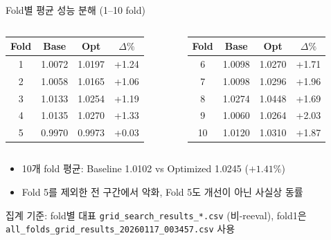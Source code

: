 \documentclass[aspectratio=169,10pt]{beamer}
\begin{document}
\begin{frame}[shrink=5]{Fold별 평균 성능 분해 (1--10 fold)}
	\begin{columns}[T]
		\renewcommand{\arraystretch}{1.2}
		\begin{tabular}{c|c|c|c}
			\toprule
			Fold & Base & Opt & \(\Delta\%\) \\
			\midrule
			1 & 1.0072 & 1.0197 & +1.24 \\
			2 & 1.0058 & 1.0165 & +1.06 \\
			3 & 1.0133 & 1.0254 & +1.19 \\
			4 & 1.0135 & 1.0270 & +1.33 \\
			5 & 0.9970 & 0.9973 & +0.03 \\
			\bottomrule
		\end{tabular}

		\renewcommand{\arraystretch}{1.2}
		\begin{tabular}{c|c|c|c}
			\toprule
			Fold & Base & Opt & \(\Delta\%\) \\
			\midrule
			6  & 1.0098 & 1.0270 & +1.71 \\
			7  & 1.0098 & 1.0296 & +1.96 \\
			8  & 1.0274 & 1.0448 & +1.69 \\
			9  & 1.0060 & 1.0264 & +2.03 \\
			10 & 1.0120 & 1.0310 & +1.87 \\
			\bottomrule
		\end{tabular}
	\end{columns}

	\vspace{0.35em}
	\begin{itemize}
		\item 10개 fold 평균: Baseline 1.0102 vs Optimized 1.0245 (\(+1.41\%\))
		\item Fold 5를 제외한 전 구간에서 악화, Fold 5도 개선이 아닌 사실상 동률
	\end{itemize}

	{\scriptsize 집계 기준: fold별 대표 \texttt{grid\_search\_results\_*.csv} (비-reeval), fold1은 \texttt{all\_folds\_grid\_results\_20260117\_003457.csv} 사용}
\end{frame}
\end{document}
